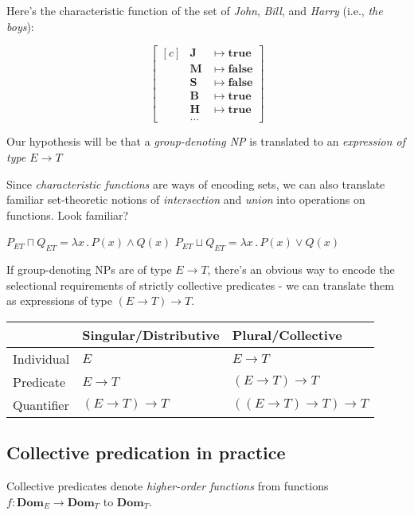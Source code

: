 \documentclass[letterpaper,parskip=half]{scrartcl}
\begin{document}
Here's the characteristic function of the set of \emph{John}, \emph{Bill}, and \emph{Harry} (i.e., \emph{the boys}):

\[\left[\begin{aligned}[c]
&\mathbf{J} &\mapsto \mathbf{true}\\
&\mathbf{M} &\mapsto \mathbf{false}\\
&\mathbf{S} &\mapsto \mathbf{false}\\
&\mathbf{B} &\mapsto \mathbf{true}\\
&\mathbf{H} &\mapsto \mathbf{true}\\
&\ldots
\end{aligned}\right]\]

Our hypothesis will be that a \emph{group-denoting NP} is translated to an \emph{expression of type \(E \to T\)}

Since \emph{characteristic functions} are ways of encoding sets, we can also translate familiar set-theoretic notions of \emph{intersection} and \emph{union} into operations on functions. Look familiar?  

\begin{exe}
\ex \(P_{ET} \sqcap Q_{ET}= \lambda x\,.\,P(x) \wedge Q(x)\)
\ex \(P_{ET} \sqcup Q_{ET}= \lambda x\,.\,P(x) \vee Q(x)\)
\label{orgf060a17}
\end{exe}

If group-denoting NPs are of type \(E \to T\), there's an obvious way to encode the selectional requirements of strictly collective predicates - we can translate them as expressions of type \((E \to T) \to T\).

\begin{center}
\begin{tabular}{lll}
 & Singular/Distributive & Plural/Collective\\[0pt]
\hline
Individual & \(E\) & \(E \to T\)\\[0pt]
Predicate & \(E \to T\) & \((E \to T) \to T\)\\[0pt]
Quantifier & \((E \to T) \to T\) & \(((E \to T) \to T) \to T\)\\[0pt]
\end{tabular}
\end{center}

\subsection{Collective predication in practice}
\label{sec:orga3641d4}

Collective predicates denote \emph{higher-order functions} from functions \(f: \mathbf{Dom}_E \to \mathbf{Dom}_T\) to \(\mathbf{Dom}_T\).
\end{document}
